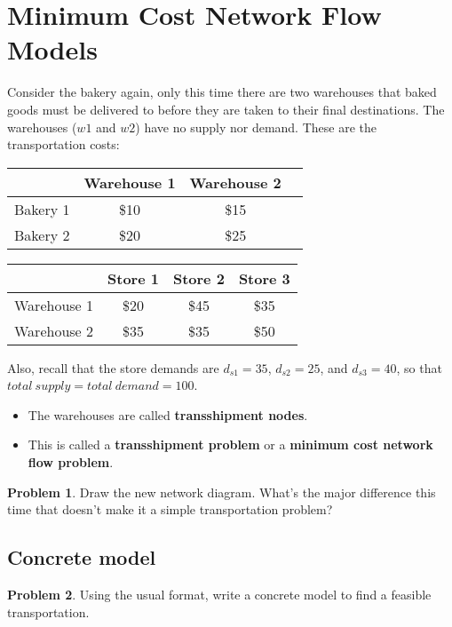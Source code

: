 \documentclass[11pt]{article}
\theoremstyle{definition}
\newtheorem{problem}{Problem}
\begin{document}
\section{Minimum Cost Network Flow Models}

Consider the bakery again, only this time there are two warehouses that baked goods must be delivered to before they are taken to their final destinations.  The warehouses ($w1$ and $w2$) have no supply nor demand.  These are the transportation costs:

\begin{center}
\begin{tabular}{|c|c|c|c|}
\hline
& Warehouse 1 & Warehouse 2 \\
\hline
Bakery 1 & \$10 & \$15 \\
\hline
Bakery 2 & \$20 & \$25 \\
\hline
\end{tabular}
\begin{tabular}{|c|c|c|c|}
\hline
& Store 1 & Store 2 & Store 3 \\
\hline
Warehouse 1 & \$20 & \$45 & \$35 \\
\hline
Warehouse 2 & \$35 & \$35 & \$50 \\
\hline
\end{tabular}
\end{center}
Also, recall that the store demands are $d_{s1} = 35$, $d_{s2} = 25$, and $d_{s3} = 40$, so that $total~supply = total~demand = 100$.
\begin{itemize}
\item The warehouses are called \textbf{transshipment nodes}.   
\item This is called a \textbf{transshipment problem} or a \textbf{minimum cost network flow problem}.
\end{itemize}

\begin{problem}
Draw the new network diagram. What's the major difference this time that doesn't make it a simple transportation problem?
\end{problem} \newpage


\subsection{Concrete model}
\begin{problem}
Using the usual format, write a concrete model to find a feasible transportation.
\end{problem}
\end{document}
